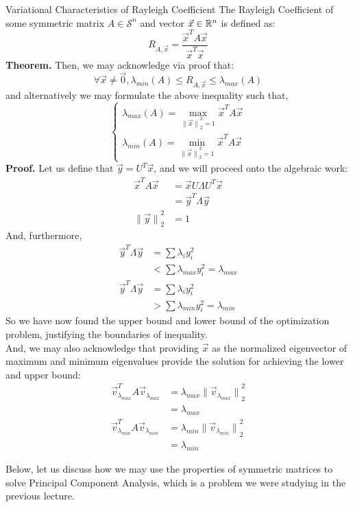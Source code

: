 \begin{ln-theorem}{Variational Characteristics of Rayleigh Coefficient}{}
    The Rayleigh Coefficient of some symmetric matrix $A \in \mathcal{S}^n$ and vector $\vec{x} \in \mathbb{R}^n$ is defined as:
    \[
        R_{A, \vec{x}} = \frac{\vec{x}^T A \vec{x}}{\vec{x}^T \vec{x}}
    \]
    \textbf{Theorem.}
    Then, we may acknowledge via proof that:
    \[
        \forall \vec{x} \neq \vec{0}, \lambda_{min}(A) \leq R_{A, \vec{x}} \leq \lambda_{max}(A)
    \]
    and alternatively we may formulate the above inequality such that,
    \[
        \begin{cases}
            \lambda_{max}(A) = \max_{{\lVert \vec{x} \rVert}_2^2 = 1}\vec{x}^T A \vec{x} \\
            \lambda_{min}(A) = \min_{{\lVert \vec{x} \rVert}_2^2 = 1}\vec{x}^T A \vec{x}
        \end{cases}
    \]
    \tcblower
    \textbf{Proof.}
    Let us define that $\vec{y} = U^T \vec{x}$, and we will proceed onto the algebraic work:
    \begin{align*}
        \vec{x}^T A \vec{x}
        &= \vec{x} U \Lambda U^T \vec{x} \\
        &= \vec{y}^T \Lambda \vec{y} \\
        {\lVert \vec{y} \rVert}_2^2 &= 1
    \end{align*}
    And, furthermore,
    \begin{align*}
        \vec{y}^T \Lambda \vec{y}
        &= \sum \lambda_i y_i^2 \\
        &< \sum \lambda_{max} y_i^2 = \lambda_{max} \\
        \vec{y}^T \Lambda \vec{y}
        &= \sum \lambda_i y_i^2 \\
        &> \sum \lambda_{min} y_i^2 = \lambda_{min}
    \end{align*}
    So we have now found the upper bound and lower bound of the optimization problem, justifying the boundaries of inequality. \\
    And, we may also acknowledge that providing $\vec{x}$ as the normalized eigenvector of maximum and minimum eigenvalues provide the solution for achieving the lower and upper bound:
    \begin{align*}
        \vec{v}_{\lambda_{max}}^T A \vec{v}_{\lambda_{max}}
        &= \lambda_{max} {\lVert \vec{v}_{\lambda_{max}} \rVert}_2^2 \\
        &= \lambda_{max} \\
        \vec{v}_{\lambda_{min}}^T A \vec{v}_{\lambda_{min}}
        &= \lambda_{min} {\lVert \vec{v}_{\lambda_{min}} \rVert}_2^2 \\
        &= \lambda_{min}
    \end{align*}
\end{ln-theorem}
Below, let us discuss how we may use the properties of symmetric matrices to solve Principal Component Analysis, which is a problem we were studying in the previous lecture.

